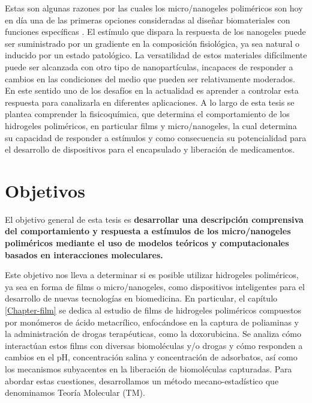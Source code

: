 Estas son algunas razones por las cuales los micro/nanogeles polim\'ericos son hoy en d\'ia una de las primeras opciones consideradas al dise\~nar biomateriales con funciones espec\'ificas \cite{soni2016nanogels,sabir2019polymeric}. El est\'imulo que dispara la respuesta de los nanogeles puede ser suministrado por un gradiente en la composici\'on fisiol\'ogica, ya sea natural o inducido por un estado patol\'ogico. La versatilidad de estos materiales dif\'icilmente puede ser alcanzada con otro tipo de nanopart\'iculas, incapaces de responder a cambios en las condiciones del medio que pueden ser relativamente moderados.
En este sentido uno de los desaf\'ios en la actualidad es aprender a controlar esta respuesta para canalizarla en diferentes aplicaciones. A lo largo de esta tesis se plantea comprender la fisicoqu\'imica, que determina el comportamiento de los hidrogeles polim\'ericos, en particular  films y micro/nanogeles, la cual determina su capacidad de responder a est\'imulos y como consecuencia su potencialidad para el desarrollo de dispositivos para el encapsulado y liberaci\'on de medicamentos.







\section{Objetivos}

El objetivo general de esta tesis es \textbf{desarrollar una descripci\'on comprensiva del comportamiento y respuesta a est\'imulos de los micro/nanogeles polim\'ericos mediante el uso de modelos te\'oricos y computacionales basados en interacciones moleculares.}

Este objetivo nos lleva a determinar si es posible utilizar hidrogeles polim\'ericos, ya sea en forma de films o micro/nanogeles, como dispositivos inteligentes para el desarrollo de nuevas tecnolog\'ias en biomedicina. En particular, el cap\'itulo \ref{Chapter-film} se dedica al estudio de films de hidrogeles polim\'ericos compuestos por mon\'omeros de \'acido metacr\'ilico, enfoc\'andose en la captura de poliaminas y la administraci\'on de drogas terap\'euticas, como la doxorubicina. Se analiza c\'omo interact\'uan estos films con diversas biomol\'eculas y/o drogas y c\'omo responden a cambios en el pH, concentraci\'on salina y concentraci\'on de adsorbatos, as\'i como los mecanismos subyacentes en la liberaci\'on de biomol\'eculas capturadas.
Para abordar estas cuestiones, desarrollamos un m\'etodo mecano-estad\'istico que denominamos Teor\'ia Molecular (TM).

